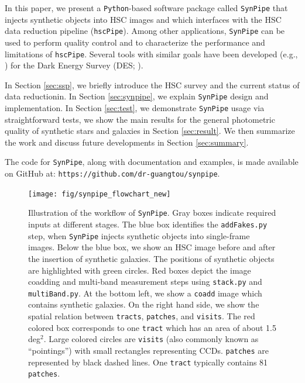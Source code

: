 \documentclass[useamsfonts]{pasj01}
\def\hscpipe{\texttt{hscPipe}}
\def\synpipe{\texttt{SynPipe}}
\def\coadd{\texttt{coadd}}
\def\tract{\texttt{tract}}
\def\visits{\texttt{visits}}
\begin{document}
    In this paper, we present a \texttt{Python}-based software package called 
    \synpipe{} that injects synthetic objects into HSC images and which interfaces with 
    the HSC data reduction pipeline (\hscpipe{}). 
    Among other applications, \synpipe{} can be used to perform quality control and 
    to characterize the performance and limitations of \hscpipe{}. 
    Several tools with similar goals have been developed (e.g., \citealt{Chang2015,
    Suchyta2016}) for the Dark Energy Survey (DES; \citealt{DES2005}).

    In Section \ref{sec:ssp}, we briefly introduce the HSC survey and the current status
    of data reductionin. 
    In Section \ref{sec:synpipe}, we explain \synpipe{} design and implementation.
    In Section \ref{sec:test}, we demonstrate \synpipe{} usage via straightforward
    tests, we show the main results for the general photometric quality of synthetic 
    stars and galaxies in Section \ref{sec:result}.
    We then summarize the work and discuss future developments in Section 
    \ref{sec:summary}.

    The code for \synpipe{}, along with documentation and examples, is made available
    on GitHub at: \texttt{https://github.com/dr-guangtou/synpipe}.
    

\begin{figure}
    \begin{center}
        \texttt{[image: fig/synpipe\_flowchart\_new]}
    \end{center}
    \caption{
        Illustration of the workflow of \synpipe{}.
        Gray boxes indicate required inputs at different stages.
        The blue box identifies the \texttt{addFakes.py} step, when \synpipe{} injects 
        synthetic objects into single-frame images. 
        Below the blue box, we show an HSC image before and after the insertion of 
        synthetic galaxies. 
        The positions of synthetic objects are highlighted with green circles. 
        Red boxes depict the image coadding and multi-band measurement steps
        using \texttt{stack.py} and \texttt{multiBand.py}. 
        At the bottom left, we show a \coadd{} image which contains synthetic galaxies. 
        On the right hand side, we show the spatial relation between \texttt{tracts},
        \texttt{patches}, and \visits{}. 
        The red colored box corresponds to one \tract{} which has an area of 
        about 1.5 deg$^2$. 
        Large colored circles are \visits{} (also commonly known as ``pointings'') 
        with small rectangles representing CCDs. 
        \texttt{patches} are represented by black dashed lines. 
        One \tract{} typically contains 81 \texttt{patches}.
        }
    \label{fig:flowchart}
\end{figure}
\end{document}
